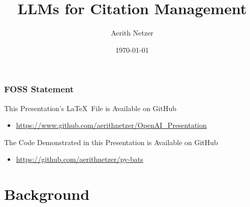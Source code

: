 \documentclass[aspectratio=169,9pt,xcolor=dvipsnames]{beamer}
\title[Intro]{LLMs for Citation Management} %
\author[Aerith Netzer]{Aerith Netzer} %
\institute[NU] %
{
Digital Publishing and Repository Librarian \\ %
\medskip
Northwestern University Libraries \\ %
\medskip
\textit{aerith.netzer@northwestern.edu} %
}
\date{\today} %
\begin{document}
\begin{frame}
\titlepage %
\end{frame}


\begin{frame}
    \frametitle{FOSS Statement}
    \begin{block}{This Presentation's \LaTeX\ File is Available on GitHub}
        \begin{itemize}
            \item \url{https://www.github.com/aerithnetzer/OpenAI_Presentation}
        \end{itemize}
    \end{block}
    \begin{block}{The Code Demonstrated in this Presentation is Available on GitHub}
        \begin{itemize}
            \item \url{https://github.com/aerithnetzer/py-bats}
        \end{itemize}
    \end{block}
\end{frame}
\section{Background} %
\end{document}
